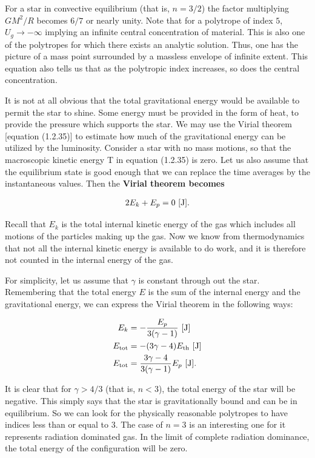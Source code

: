 \documentclass[a4paper,10pt]{article}
\begin{document}
{\noindent}For a star in convective equilibrium (that is, $n=3/2$) the factor multiplying $GM^2/R$ becomes $6/7$ or nearly unity. Note that for a polytrope of index $5$, $U_g\rightarrow-\infty$ implying an infinite central concentration of material. This is also one of the polytropes for which there exists an analytic solution. Thus, one has the picture of a mass point surrounded by a massless envelope of infinite extent. This equation also tells us that as the polytropic index increases, so does the central concentration.

{\noindent}It is not at all obvious that the total gravitational energy would be available to permit the star to shine. Some energy must be provided in the form of heat, to provide the pressure which supports the star. We may use the Virial theorem [equation (1.2.35)] to estimate how much of the gravitational energy can be utilized by the luminosity. Consider a star with no mass motions, so that the macroscopic kinetic energy T in equation (1.2.35) is zero. Let us also assume that the equilibrium state is good enough that we can replace the time averages by the instantaneous values. Then the \textbf{Virial theorem becomes}

\begin{align*}
    2E_k+E_p = 0 ~ [{\rm J}].
\end{align*}

{\noindent}Recall that $E_k$ is the total internal kinetic energy of the gas which includes all motions of the particles making up the gas. Now we know from thermodynamics that not all the internal kinetic energy is available to do work, and it is therefore not counted in the internal energy of the gas.

{\noindent}For simplicity, let us assume that $\gamma$ is constant through out the star. Remembering that the total energy $E$ is the sum of the internal energy and the gravitational energy, we can express the Virial theorem in the following ways:

\begin{align*}
    E_k &= -\frac{E_p}{3(\gamma-1)} ~ [{\rm J}]\\
    E_{\rm tot} &= -(3\gamma-4)E_{\rm th} ~ [{\rm J}]\\
    E_{\rm tot} &= \frac{3\gamma-4}{3(\gamma-1)}E_p ~ [{\rm J}].
\end{align*}

{\noindent}It is clear that for $\gamma>4/3$ (that is, $n<3$), the total energy of the star will be negative. This simply says that the star is gravitationally bound and can be in equilibrium. So we can look for the physically reasonable polytropes to have indices less than or equal to $3$. The case of $n=3$ is an interesting one for it represents radiation dominated gas. In the limit of complete radiation dominance, the total energy of the configuration will be zero.
\end{document}
